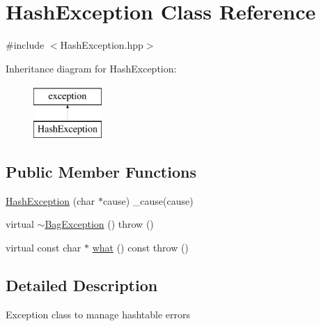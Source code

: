 \hypertarget{class_hash_exception}{\section{Hash\-Exception Class Reference}
\label{class_hash_exception}
}


{\ttfamily \#include $<$Hash\-Exception.\-hpp$>$}

Inheritance diagram for Hash\-Exception\-:\begin{figure}[H]
\begin{center}
\leavevmode
\includegraphics[height=2.000000cm]{class_hash_exception}
\end{center}
\end{figure}
\subsection*{Public Member Functions}
\begin{DoxyCompactItemize}
\item 
\hyperlink{class_hash_exception_a8c2082a0f1bd55ff67869045d26d79b5}{Hash\-Exception} (char $\ast$cause) \-\_\-cause(cause)
\item 
virtual \hyperlink{class_hash_exception_a12cbec987f6181a57633a0d78de45326}{$\sim$\-Bag\-Exception} ()  throw ()
\item 
virtual const char $\ast$ \hyperlink{class_hash_exception_a542711eb0045dcec64d7a8596b2450ff}{what} () const   throw ()
\end{DoxyCompactItemize}


\subsection{Detailed Description}
Exception class to manage hashtable errors 

